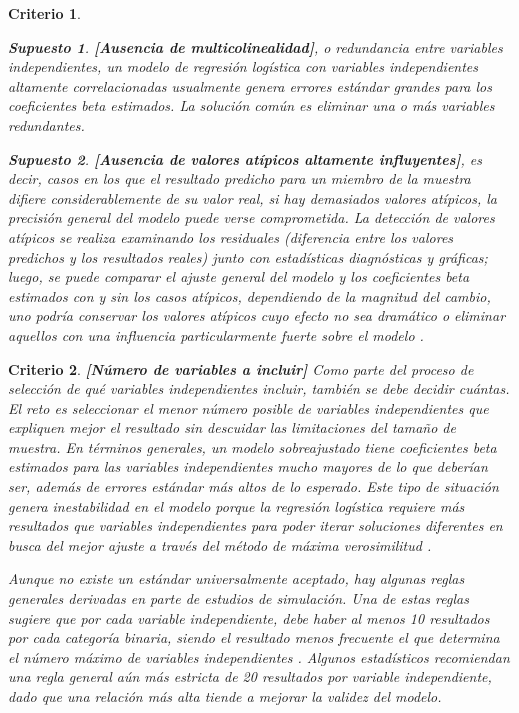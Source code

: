 \documentclass[12pt]{article}
\newtheorem{Criterio}{Criterio}%
\newtheorem{Sup}{Supuesto}%
\begin{document}
\begin{Criterio}
\begin{Sup} \textbf{[Ausencia de multicolinealidad]}, o redundancia entre variables independientes,  un modelo de regresi\'on log\'istica con variables independientes altamente correlacionadas usualmente genera errores est\'andar grandes para los coeficientes beta estimados. La soluci\'on com\'un es eliminar una o m\'as variables redundantes.\cite{tabachnick2007}
\end{Sup}

\begin{Sup} \textbf{[Ausencia de valores at\'ipicos altamente influyentes]}, es decir, casos en los que el resultado predicho para un miembro de la muestra difiere considerablemente de su valor real, si hay demasiados valores at\'ipicos, la precisi\'on general del modelo puede verse comprometida. La detecci\'on de valores at\'ipicos se realiza examinando los residuales (diferencia entre los valores predichos y los resultados reales) junto con estad\'isticas diagn\'osticas y gr\'aficas; luego, se puede comparar el ajuste general del modelo y los coeficientes beta estimados con y sin los casos at\'ipicos, dependiendo de la magnitud del cambio, uno podr\'ia conservar los valores at\'ipicos cuyo efecto no sea dram\'atico\cite{hosmer2000} o eliminar aquellos con una influencia particularmente fuerte sobre el modelo \cite{tabachnick2007,hosmer2000}.
\end{Sup}
\end{Criterio}

\begin{Criterio} \textbf{[N\'umero de variables a incluir]} Como parte del proceso de selecci\'on de qu\'e variables independientes incluir, tambi\'en se debe decidir cu\'antas. El reto es seleccionar el menor n\'umero posible de variables independientes que expliquen mejor el resultado sin descuidar las limitaciones del tama\~no de muestra. En t\'erminos generales, un modelo sobreajustado tiene coeficientes beta estimados para las variables independientes mucho mayores de lo que deber\'ian ser, adem\'as de errores est\'andar m\'as altos de lo esperado. Este tipo de situaci\'on genera inestabilidad en el modelo porque la regresi\'on log\'istica requiere m\'as resultados que variables independientes para poder iterar soluciones diferentes en busca del mejor ajuste a trav\'es del m\'etodo de m\'axima verosimilitud \cite{tabachnick2007,hosmer2000}.

Aunque no existe un est\'andar universalmente aceptado, hay algunas \textit{reglas generales} derivadas en parte de estudios de simulaci\'on. Una de estas reglas sugiere que por cada variable independiente, debe haber al menos 10 resultados por cada categor\'ia binaria, siendo el resultado menos frecuente el que determina el n\'umero m\'aximo de variables independientes \cite{peduzzi1996, agresti2007}. Algunos estad\'isticos recomiendan una \textit{regla general} a\'un m\'as estricta de 20 resultados por variable independiente, dado que una relaci\'on m\'as alta tiende a mejorar la validez del modelo\cite{feinstein1996}. 
\end{Criterio}
\end{document}
